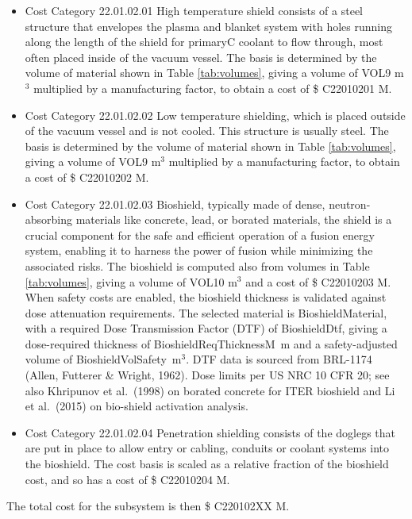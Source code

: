 \begin{itemize}
    \item Cost Category 22.01.02.01 High temperature shield consists of a steel structure that envelopes the plasma and blanket system with holes running along the length of the shield for primaryC coolant to flow through, most often placed inside of the vacuum vessel. The basis is determined by the volume of material shown in Table \ref{tab:volumes}, giving a volume of VOL9  m$^{3}$ multiplied by a manufacturing factor, to obtain a cost of \$ C22010201 M. %
    \item Cost Category 22.01.02.02 Low temperature shielding, which is placed outside of the vacuum vessel and is not cooled.  This structure is usually steel.  The basis is determined by the volume of material shown in Table \ref{tab:volumes}, giving a volume of VOL9  m$^{3}$ multiplied by a manufacturing factor, to obtain a cost of \$ C22010202 M.
    \item Cost Category 22.01.02.03 Bioshield, typically made of dense, neutron-absorbing materials like concrete, lead, or borated materials, the shield is a crucial component for the safe and efficient operation of a fusion energy system, enabling it to harness the power of fusion while minimizing the associated risks.  The bioshield is computed also from volumes in Table \ref{tab:volumes}, giving a volume of VOL10 m$^{3}$ and a cost of \$ C22010203 M.
\ifsafetycosts
    When safety costs are enabled, the bioshield thickness is validated against dose attenuation requirements. The selected material is BioshieldMaterial, with a required Dose Transmission Factor (DTF) of BioshieldDtf, giving a dose-required thickness of BioshieldReqThicknessM~m and a safety-adjusted volume of BioshieldVolSafety~m$^{3}$. DTF data is sourced from BRL-1174 (Allen, Futterer \& Wright, 1962). Dose limits per US NRC 10 CFR 20; see also Khripunov et al.\ (1998) on borated concrete for ITER bioshield and Li et al.\ (2015) on bio-shield activation analysis.
\fi
    \item Cost Category 22.01.02.04 Penetration shielding consists of the doglegs that are put in place to allow entry or cabling, conduits or coolant systems into the bioshield.  The cost basis is scaled as a relative fraction of the bioshield cost, and so has a cost of \$ C22010204 M.
\end{itemize}

The total cost for the subsystem is then \$ C220102XX M.




